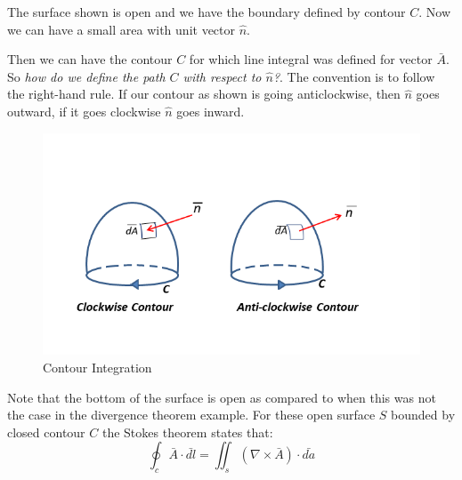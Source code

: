 
The surface shown is open and we have the boundary defined by contour $C$. Now we can have a small area with unit vector $\hat{n}$.

Then we can have the contour $C$ for which line integral was defined for vector $\bar{A}$. So \emph{how do we define the path $C$ with respect to $\hat{n}$?}. The convention is to follow the right-hand rule. If our contour as shown is going anticlockwise, then $\hat{n}$ goes outward, if it goes clockwise $\hat{n}$ goes inward.

\begin{figure}
\centering
\includegraphics[width=1.2\linewidth]{graphics/contour_integral}
\caption{Contour Integration}
\end{figure}

Note that the bottom of the surface is open as compared to when this was not the case in the divergence theorem example. For these open surface $S$ bounded by closed contour $C$ the Stokes theorem states that:
\begin{equation}
\oint_c \bar{A} \cdot \bar{dl} = \iint_s  (\nabla \times \bar{A})\cdot\bar{da}
\end{equation}

